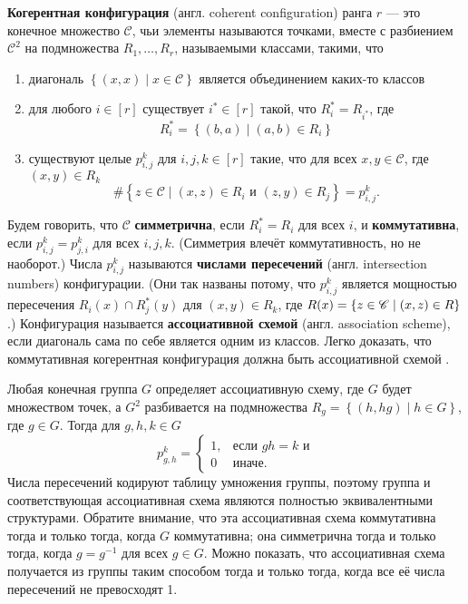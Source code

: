 \begin{definition}\label{def:12:cc}
   \textbf{Когерентная конфигурация} (англ. coherent configuration) ранга $r$ --- это конечное множество $\mathscr{C}$, чьи элементы называются точками, вместе с разбиением $\mathscr{C}^2$ на подмножества $R_1, \dotsc, R_r$, называемыми классами, такими, что
   \begin{enumerate}
     \item \label{item:1:def:12:cc} диагональ $\left\{ (x,x) \mid x \in \mathscr{C} \right\}$ является объединением каких-то классов
     \item \label{item:2:def:12:cc} для любого $i \in [r]$ существует $i^* \in [r]$ такой, что $R_i^* = R_{i^*}$, где
     \[
     	R_i^* = \left\{ (b,a) \mid (a,b) \in R_i \right\}
     \]
     \item \label{item:3:def:12:cc} существуют целые $p_{i,j}^k$ для $i,j,k \in [r]$ такие, что для всех $x,y \in \mathscr{C}$, где $(x,y) \in R_k$
     \[
     	\#\left\{ z \in \mathscr{C} \mid (x,z) \in R_i \text{ и } (z,y) \in R_j \right\} = p_{i,j}^k.
     \]
   \end{enumerate}
\end{definition}
Будем говорить, что $\mathscr{C}$ \textbf{симметрична}, если $R_i^*=R_i$ для всех $i$, и \textbf{коммутативна}, если $p_{i,j}^k=p_{j,i}^k$ для всех $i,j,k$. (Симметрия влечёт коммутативность, но не наоборот.) Числа $p_{i,j}^k$ называются \textbf{числами пересечений} (англ. intersection numbers) конфигурации. (Они так названы потому, что $p_{i,j}^k$ является мощностью пересечения $R_i(x) \cap R_j^*(y)$ для $(x, y) \in R_k$, где $R(x) = \left\{ z \in \mathscr{C} \mid (x, z) \in R \right\}$.) Конфигурация называется \textbf{ассоциативной схемой} (англ. association scheme), если диагональ сама по себе является одним из классов. Легко доказать, что коммутативная когерентная конфигурация должна быть ассоциативной схемой \cite[14]{Hig75}.

Любая конечная группа $G$ определяет ассоциативную схему, где $G$ будет множеством точек, а $G^2$ разбивается на подмножества $R_g = \left\{ (h,hg) \mid h \in G \right\}$, где $g \in G$. Тогда для $g,h,k \in G$
\[
	p_{g,h}^k = 
	\begin{cases} 
		1, & \mbox{если } gh=k\mbox{ и} \\ 
		0 & \mbox{иначе}.
	\end{cases}
\]
Числа пересечений кодируют таблицу умножения группы, поэтому группа и соответствующая ассоциативная схема являются полностью эквивалентными структурами. Обратите внимание, что эта ассоциативная схема коммутативна тогда и только тогда, когда $G$ коммутативна; она симметрична тогда и только тогда, когда $g=g^{-1}$ для всех $g \in G$. Можно показать, что ассоциативная схема получается из группы таким способом тогда и только тогда, когда все её числа пересечений не превосходят 1.


